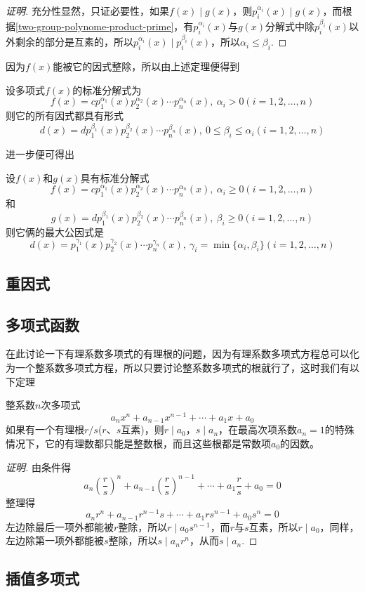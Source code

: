 \begin{proof}[证明]
  充分性显然，只证必要性，如果$f(x) \mid g(x)$，则$p_i^{\alpha_i}(x) \mid g(x)$，而根据\autoref{two-group-polynome-product-prime}，有$p_i^{\alpha_i}(x)$与$g(x)$分解式中除$p_i^{\beta_i}(x)$以外剩余的部分是互素的，所以$p_i^{\alpha_i}(x) \mid p_i^{\beta_i}(x)$，所以$\alpha_i \leqslant \beta_i$.
\end{proof}

因为$f(x)$能被它的因式整除，所以由上述定理便得到
\begin{theorem}
  设多项式$f(x)$的标准分解式为
\[ f(x)=c p_1^{\alpha_1}(x)p_2^{\alpha_2}(x) \cdots p_n^{\alpha_n}(x), \  \alpha_i>0 (i=1,2,\ldots,n) \]
则它的所有因式都具有形式
\[ d(x)=d p_1^{\beta_1}(x)p_2^{\beta_2}(x) \cdots p_n^{\beta_n}(x), \  0 \leqslant \beta_i \leqslant \alpha_i (i=1,2,\ldots,n) \]
\end{theorem}

进一步便可得出
\begin{theorem}
  设$f(x)$和$g(x)$具有标准分解式
\[ f(x)=c p_1^{\alpha_1}(x)p_2^{\alpha_2}(x) \cdots p_n^{\alpha_n}(x), \  \alpha_i \geqslant 0 (i=1,2,\ldots,n) \]
和
\[ g(x)=d p_1^{\beta_1}(x)p_2^{\beta_2}(x) \cdots p_n^{\beta_n}(x), \  \beta_i \geqslant 0 (i=1,2,\ldots,n) \]
则它俩的最大公因式是
\[ d(x)= p_1^{\gamma_1}(x)p_2^{\gamma_2}(x) \cdots p_n^{\gamma_n}(x), \  \gamma_i=\min\{\alpha_i,\beta_i\} (i=1,2,\ldots,n) \]
\end{theorem}


\subsection{重因式}
\label{sec:mulitple-factor}

\subsection{多项式函数}
\label{sec:polynome-function}

在此讨论一下有理系数多项式的有理根的问题，因为有理系数多项式方程总可以化为一个整系数多项式方程，所以只要讨论整系数多项式的根就行了，这时我们有以下定理
\begin{theorem}
  整系数$n$次多项式
  \[ a_nx^n+a_{n-1}x^{n-1}+\cdots+a_1x+a_0 \]
  如果有一个有理根$r/s$($r$、$s$互素)，则$r \mid a_0$，$s \mid a_n$，在最高次项系数$a_n=1$的特殊情况下，它的有理数都只能是整数根，而且这些根都是常数项$a_0$的因数。
\end{theorem}

\begin{proof}[证明]
  由条件得
  \[ a_n \left( \frac{r}{s} \right)^{n} + a_{n-1}\left( \frac{r}{s} \right)^{n-1} + \cdots + a_1 \frac{r}{s} + a_0 = 0 \]
  整理得
  \[ a_nr^n + a_{n-1}r^{n-1}s + \cdots + a_1rs^{n-1} + a_0s^n = 0 \]
  左边除最后一项外都能被$r$整除，所以$r \mid a_0s^{n-1}$，而$r$与$s$互素，所以$r \mid a_0$，同样，左边除第一项外都能被$s$整除，所以$s \mid a_nr^n$，从而$s \mid a_n$.
\end{proof}

\subsection{插值多项式}
\label{sec:interpolation-polynome}






